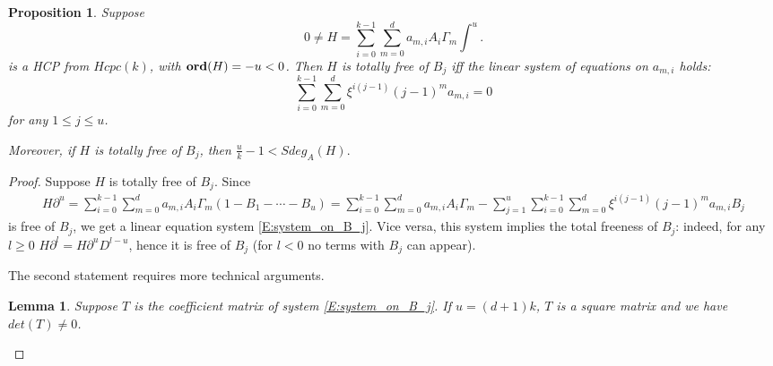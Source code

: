 \documentclass[11pt]{article}
\theoremstyle{definition}
\newcommand{\Ord}{\mathop {\rm \bf ord}}
\theoremstyle{plain}
\newtheorem{Prop}{Proposition}[section]
\newtheorem{lemma}{Lemma}[section]
\numberwithin{equation}{section}
\begin{document}
\begin{Prop}
\label{P:lower estimate}
Suppose 
$$
0\neq H=\sum_{i=0}^{k-1}\sum_{m=0}^da_{m,i}A_i\Gamma_m\int^u.
$$ 	
is a HCP  from $Hcpc(k)$,  with $\Ord(H)=-u<0$. Then $H$ is totally free of $B_j$ iff the linear system of equations on $a_{m,i}$ holds:
\begin{equation}
\label{E:system_on_B_j}
\sum_{i=0}^{k-1}\sum_{m=0}^d\xi^{i(j-1)}(j-1)^ma_{m,i}=0
\end{equation}
for any $1\leq j\leq u$.

Moreover, if $H$ is totally free of $B_j$, then $\frac{u}{k}-1< Sdeg_A(H).$
\end{Prop}

\begin{proof}
    Suppose  $H$ is totally free of $B_j$. Since 
\begin{multline*}
	H\partial^u=\sum_{i=0}^{k-1}\sum_{m=0}^da_{m,i}A_i\Gamma_m(1-B_1-\cdots-B_{u})
	=\sum_{i=0}^{k-1}\sum_{m=0}^da_{m,i}A_i\Gamma_m-\sum_{j=1}^{u}\sum_{i=0}^{k-1}\sum_{m=0}^d\xi^{i(j-1)}(j-1)^ma_{m,i}B_j
\end{multline*}
is free of $B_j$, we get a linear equation system \eqref{E:system_on_B_j}. Vice versa, this system implies the total freeness of $B_j$: indeed, for any $l\ge 0$ $H\partial^l= H\partial^u D^{l-u}$, hence it is free of $B_j$ (for $l<0$  no terms with $B_j$ can appear). 

The second statement requires more technical arguments. 
   
 
\begin{lemma}
	\label{L:Tkdu full rank when u=(d+1)k}
	Suppose $T$ is the coefficient matrix of  system \eqref{E:system_on_B_j}. If $u=(d+1)k$, $T$ is a square matrix and we have $det(T)\neq 0$.
\end{lemma}


\end{proof}
\end{document}
